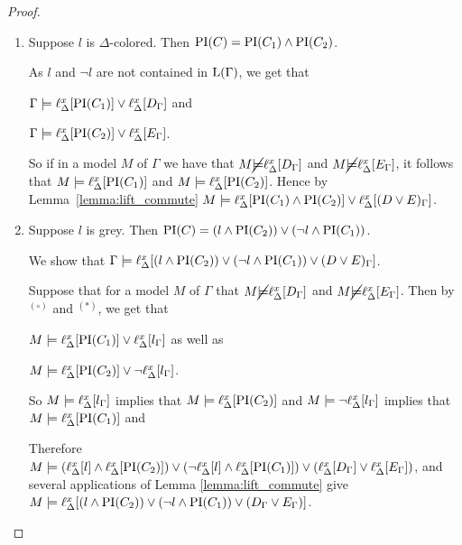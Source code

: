 \begin{proof}
\begin{itemize}
\begin{enumerate}
				\item Suppose $l$ is $\Delta$-colored.
					Then $\PI(C) = \PI(C_1) \land \PI(C_2)$.

					As $l$ and $\lnot l$ are not contained in $\Lang(\Gamma)$, we get that 

					$\Gamma \entails \lift{\Delta}{ \PI(C_1) }{x} \lor
					\lift{\Delta}{ D_\Gamma }{x}$
					and

					$\Gamma \entails \lift{\Delta}{ \PI(C_2) }{x} \lor
					\lift{\Delta}{ E_\Gamma }{x}$.

					So if in a model $M$ of $\Gamma$ we have that
					$M \cancel\entails \lift{\Delta}{ D_\Gamma }{x}$ and 
					$M \cancel\entails \lift{\Delta}{ E_\Gamma }{x}$, it follows that $M \entails \lift{\Delta}{ \PI(C_1) }{x}$ and $M \entails \lift{\Delta}{ \PI(C_2) }{x}$. Hence by Lemma~\ref{lemma:lift_commute}
					$M \entails \lift{\Delta}{ \PI(C_1) \land \PI(C_2) }{x} \lor
					\lift{\Delta}{ (D \lor E)_\Gamma }{x}$.

				\item Suppose $l$ is grey.
					Then $\PI(C) =  (l \land \PI(C_2)) \lor (\lnot l \land \PI(C_1))$.

					We show that 
					$\Gamma \entails \lift{\Delta}{(l \land \PI(C_2)) \lor (\lnot l \land \PI(C_1)) \lor (D \lor E)_\Gamma  }{x} $. 

					Suppose that for a model $M$ of $\Gamma$ that 
					$M \cancel\entails \lift{\Delta}{ D_\Gamma }{x}$ and 
					$M \cancel\entails \lift{\Delta}{ E_\Gamma }{x}$.
					Then by $^{(\circ)}$
					and $^{(*)}$, we get that\nopagebreak

					$M \entails \lift{\Delta}{ \PI(C_1) }{x} \lor
					\lift{\Delta}{ l_\Gamma }{x}$ as well as

					$M \entails \lift{\Delta}{ \PI(C_2) }{x} \lor
					\lnot \lift{\Delta}{ l_\Gamma }{x}$.

					So $M \entails \lift{\Delta}{ l_\Gamma }{x}$ implies that 
					$M \entails \lift{\Delta}{\PI(C_2)}{x}$ and 
					$M \entails \lnot \lift{\Delta}{ l_\Gamma }{x}$  implies that 
					$M \entails \lift{\Delta}{\PI(C_1)}{x}$ and 

					Therefore
					$M\entails (\lif{l} \land \lif{\PI(C_2)}) \lor (\lnot \lif{l} \land \lif{\PI(C_1)}) \lor (\lif{D_\Gamma} \lor \lif{E_\Gamma}) $,
					and several applications of Lemma \ref{lemma:lift_commute} give
					$M\entails \lif{(l \land \PI(C_2)) \lor (\lnot {l} \land {\PI(C_1)}) \lor ({D_\Gamma} \lor {E_\Gamma})} $.
			\end{enumerate}



\end{itemize}
\end{proof}
